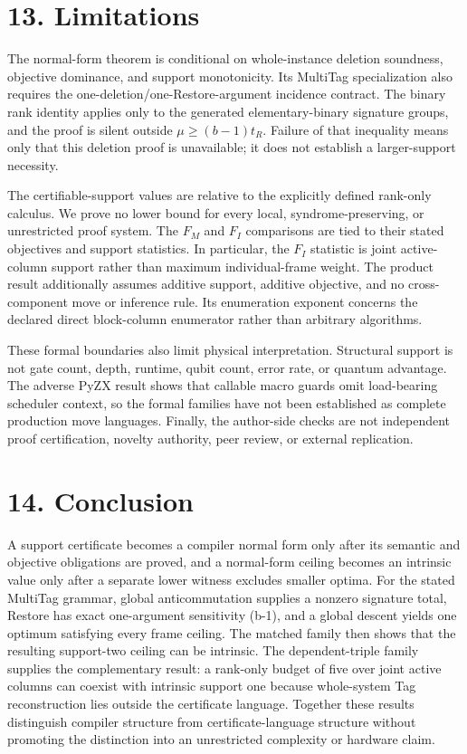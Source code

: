 \documentclass[11pt]{article}
\begin{document}
\section*{13. Limitations}\label{limitations}

The normal-form theorem is conditional on whole-instance deletion soundness, objective dominance, and support monotonicity. Its MultiTag specialization also requires the one-deletion/one-Restore-argument incidence contract. The binary rank identity applies only to the generated elementary-binary signature groups, and the proof is silent outside \(\mu\geq(b-1)t_R\). Failure of that inequality means only that this deletion proof is unavailable; it does not establish a larger-support necessity.

The certifiable-support values are relative to the explicitly defined rank-only calculus. We prove no lower bound for every local, syndrome-preserving, or unrestricted proof system. The \(F_M\) and \(F_I\) comparisons are tied to their stated objectives and support statistics. In particular, the \(F_I\) statistic is joint active-column support rather than maximum individual-frame weight. The product result additionally assumes additive support, additive objective, and no cross-component move or inference rule. Its enumeration exponent concerns the declared direct block-column enumerator rather than arbitrary algorithms.

These formal boundaries also limit physical interpretation. Structural support is not gate count, depth, runtime, qubit count, error rate, or quantum advantage. The adverse PyZX result shows that callable macro guards omit load-bearing scheduler context, so the formal families have not been established as complete production move languages. Finally, the author-side checks are not independent proof certification, novelty authority, peer review, or external replication.

\section*{14. Conclusion}\label{conclusion}

A support certificate becomes a compiler normal form only after its semantic and objective obligations are proved, and a normal-form ceiling becomes an intrinsic value only after a separate lower witness excludes smaller optima. For the stated MultiTag grammar, global anticommutation supplies a nonzero signature total, Restore has exact one-argument sensitivity (b-1), and a global descent yields one optimum satisfying every frame ceiling. The matched family then shows that the resulting support-two ceiling can be intrinsic. The dependent-triple family supplies the complementary result: a rank-only budget of five over joint active columns can coexist with intrinsic support one because whole-system Tag reconstruction lies outside the certificate language. Together these results distinguish compiler structure from certificate-language structure without promoting the distinction into an unrestricted complexity or hardware claim.
\end{document}
